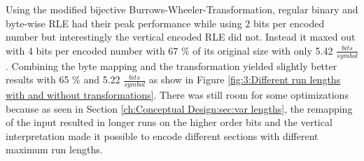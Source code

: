 \par{
Using the modified bijective Burrows-Wheeler-Transformation, regular binary and byte-wise RLE had their peak performance while using 2 bits per encoded number but interestingly the vertical encoded RLE did not. Instead it maxed out with 4 bits per encoded number with 67 \% of its original size with only 5.42 $\frac{bits}{symbol}$. Combining the byte mapping and the transformation yielded slightly better results with 65 \% and 5.22 $\frac{bits}{symbol}$ as show in Figure \ref{fig:3:Different run lengths with and without transformations}. There was still room for some optimizations because as seen in Section \ref{ch:Conceptual Design:sec:var lengths}, the remapping of the input resulted in longer runs on the higher order bits and the vertical interpretation made it possible to encode different sections with different maximum run lengths.

}

